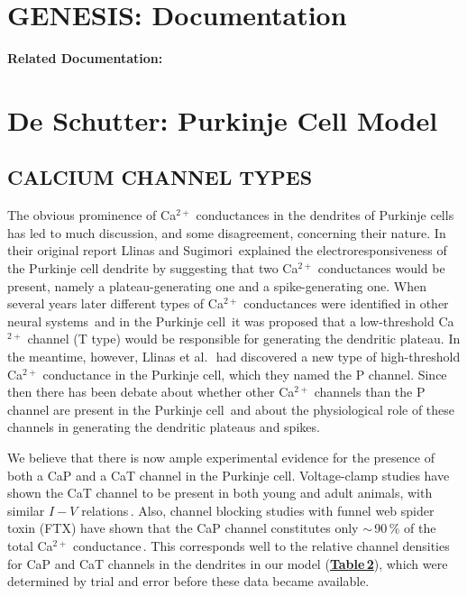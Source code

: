 \documentclass[12pt]{article}
\begin{document}
\section*{GENESIS: Documentation}

{\bf Related Documentation:}

\section*{De Schutter: Purkinje Cell Model}

\subsection*{CALCIUM CHANNEL TYPES}
The obvious prominence of
Ca$^{2+}$ conductances in the dendrites of Purkinje cells has led
to much discussion, and some disagreement, concerning
their nature. In their original report Llinas and Sugimori\,\cite{R:1980pi}
explained the electroresponsiveness of the Purkinje
cell dendrite by suggesting that two Ca$^{2+}$ conductances
would be present, namely a plateau-generating one
and a spike-generating one. When several years later different
types of Ca$^{2+}$ conductances were identified in other
neural systems\,\cite{Fox:1987zr} and in the Purkinje cell\,\cite{Bossu:1989kl, Fortier:1991fk}
it was proposed that a
low-threshold Ca$^{2+}$ channel (T type) would be responsible
for generating the dendritic plateau. In the meantime, however,
Llinas et al.\,\cite{R:1980pi, R:1980pi}\ had discovered a new type of
high-threshold Ca$^{2+}$ conductance in the Purkinje cell,
which they named the P channel. Since then there has been
debate about whether other Ca$^{2+}$ channels than the P channel
are present in the Purkinje cell\,\cite{Fortier:1991fk, Llinas:1989uq, Usowicz:1992qf} and about the
physiological role of these channels in generating the dendritic
plateaus and spikes.

We believe that there is now ample experimental evidence
for the presence of both a CaP and a CaT channel in
the Purkinje cell. Voltage-clamp studies have shown the
CaT channel to be present in both young and adult animals,
with similar $I-V$ relations\,\cite{Kaneda:1990ys, Regan:1991ly}. 
Also, channel blocking studies with funnel web
spider toxin (FTX) have shown that the CaP channel constitutes
only $\sim$\,90\,\% of the total Ca$^{2+}$ conductance\,\cite{Mintz:1992kx}. 
This corresponds well to the relative channel
densities for CaP and CaT channels in the dendrites in our
model (\href{../pub-purkinje-deschutter1-table2/pub-purkinje-deschutter1-table2.tex}{\bf Table\,2}),
which were determined by trial and error
before these data became available.
\end{document}
